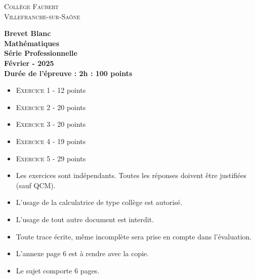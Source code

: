 





\begin{titlepage}

    \center %
    
    \textsc{\LARGE Collège Faubert}\\[1cm] %
    \textsc{\large Villefranche-sur-Saône}\\[0.5cm] %
    
    \horrule{2px}
    
    \vspace{0.5cm}
    
    {\Huge \bfseries Brevet Blanc}\\[1cm] %
    {\Huge \bfseries Mathématiques}\\[1cm] %
    {\Huge  \bfseries Série Professionnelle}\\[1cm]
    {\large \bfseries Février - 2025}\\[1cm] 
    {\bfseries Durée de l'épreuve : 2h : 100 points}\\[1cm] 
    
    \horrule{2px}
    
    \vspace{0.5cm}
    
    \begin{itemize}[label={$\bullet$}]
      \item \textsc{Exercice 1} - 12 points     
      \item \textsc{Exercice 2} - 20 points 
      \item \textsc{Exercice 3} - 20 points
      \item \textsc{Exercice 4} - 19 points 
      \item \textsc{Exercice 5} - 29 points  
    \end{itemize}
    
    \vspace{0.5cm}
    
    \horrule{2px}
    
    \vspace{0.5cm}
    
    \begin{itemize}
      \item Les exercices sont indépendants. Toutes les réponses doivent être justifiées (sauf QCM).
      \item L'usage de la calculatrice de type collège est autorisé.
      \item L'usage de tout autre document est interdit. 
      \item Toute trace écrite, même incomplète sera prise en compte dans l'évaluation.
      \item L’annexe page 6 est à rendre avec la copie.
      \item Le sujet comporte 6 pages.
    \end{itemize}
    

\end{titlepage}
